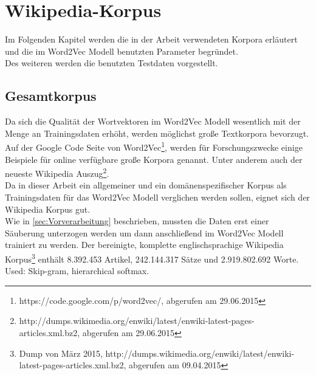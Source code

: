 \documentclass[12pt,a4paper]{report}
\begin{document}
	
	
\newpage
\chapter{Wikipedia-Korpus}
Im Folgenden Kapitel werden die in der Arbeit verwendeten Korpora erläutert und die im Word2Vec Modell benutzten Parameter begründet.\\
Des weiteren werden die benutzten Testdaten vorgestellt.

	\section{Gesamtkorpus}
	\label{sec:Gesamtkorpus}
	Da sich die Qualität  der Wortvektoren im Word2Vec Modell wesentlich mit der Menge an Trainingsdaten erhöht, werden möglichst große Textkorpora bevorzugt. Auf der Google Code Seite von Word2Vec\footnote{https://code.google.com/p/word2vec/, abgerufen am 29.06.2015}, werden für Forschungszwecke einige Beispiele für online verfügbare große Korpora genannt. Unter anderem auch der neueste Wikipedia Auszug\footnote{http://dumps.wikimedia.org/enwiki/latest/enwiki-latest-pages-articles.xml.bz2, abgerufen am 29.06.2015}.\\
	Da in dieser Arbeit ein allgemeiner und ein domänenspezifischer Korpus als Trainingsdaten für das Word2Vec Modell verglichen werden sollen, eignet sich der Wikipedia Korpus gut. \\
	Wie in \ref{sec:Vorverarbeitung} beschrieben, mussten die Daten erst einer Säuberung unterzogen werden um dann anschließend im Word2Vec Modell trainiert zu werden. Der bereinigte, komplette englischsprachige Wikipedia Korpus\footnote{Dump von März 2015, http://dumps.wikimedia.org/enwiki/latest/enwiki-latest-pages-articles.xml.bz2, abgerufen am 09.04.2015} enthält 8.392.453 Artikel, 242.144.317 Sätze und 2.919.802.692 Worte.\\

Used: Skip-gram, hierarchical softmax.\\
\end{document}
